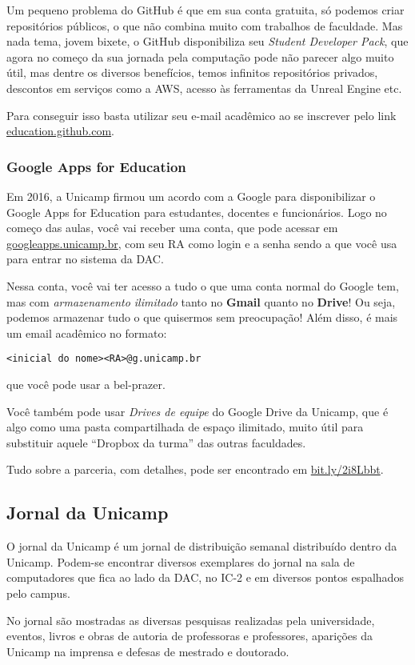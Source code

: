 Um pequeno problema do GitHub é que em sua conta gratuita, só podemos criar
repositórios públicos, o que não combina muito com trabalhos de faculdade. Mas
nada tema, jovem bixete, o GitHub disponibiliza seu \emph{Student Developer
Pack}, que agora no começo da sua jornada pela computação pode não parecer algo
muito útil, mas dentre os diversos benefícios, temos infinitos repositórios
privados, descontos em serviços como a AWS, acesso às ferramentas da Unreal
Engine etc.

Para conseguir isso basta utilizar seu e-mail acadêmico ao se inscrever pelo
link \url{education.github.com}.

\subsubsection{Google Apps for Education}

Em 2016, a Unicamp firmou um acordo com a Google para disponibilizar o Google
Apps for Education para estudantes, docentes e funcionários. Logo no começo das
aulas, você vai receber uma conta, que pode acessar em
\url{googleapps.unicamp.br}, com seu RA como login e a senha sendo a que você
usa para entrar no sistema da DAC.

Nessa conta, você vai ter acesso a tudo o que uma conta normal do Google tem,
mas com \emph{armazenamento ilimitado} tanto no \textbf{Gmail} quanto no
\textbf{Drive}! Ou seja, podemos armazenar tudo o que quisermos sem
preocupação! Além disso, é mais um email acadêmico no formato:
\begin{center}
\texttt{<inicial do nome><RA>@g.unicamp.br}
\end{center}
que você pode usar a bel-prazer.

Você também pode usar \emph{Drives de equipe} do Google Drive da Unicamp, que é
algo como uma pasta compartilhada de espaço ilimitado, muito útil para
substituir aquele ``Dropbox da turma'' das outras faculdades.

Tudo sobre a parceria, com detalhes, pode ser encontrado em
\url{bit.ly/2i8Lbbt}.

\subsection{Jornal da Unicamp}

O jornal da Unicamp é um jornal de distribuição semanal distribuído dentro da
Unicamp. Podem-se encontrar diversos exemplares do jornal na sala de
computadores que fica ao lado da DAC, no IC-2 e em diversos pontos espalhados
pelo campus.

No jornal são mostradas as diversas pesquisas realizadas pela universidade,
eventos, livros e obras de autoria de professoras e professores, aparições da
Unicamp na imprensa e defesas de mestrado e doutorado.
